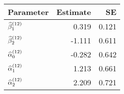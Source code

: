 \begin{table}[ht]
\centering
\begin{tabular}{lrr}
  \hline
Parameter & Estimate & SE \\ 
  \hline
$\widehat{\beta}_1^{(12)}$ & 0.319 & 0.121 \\ 
  $\widehat{\beta}_2^{(12)}$ & -1.111 & 0.611 \\ 
  $\widehat{\alpha}_0^{(12)}$ & -0.282 & 0.642 \\ 
  $\widehat{\alpha}_1^{(12)}$ & 1.213 & 0.661 \\ 
  $\widehat{\alpha}_2^{(12)}$ & 2.209 & 0.721 \\ 
   \hline
\end{tabular}
\end{table}

